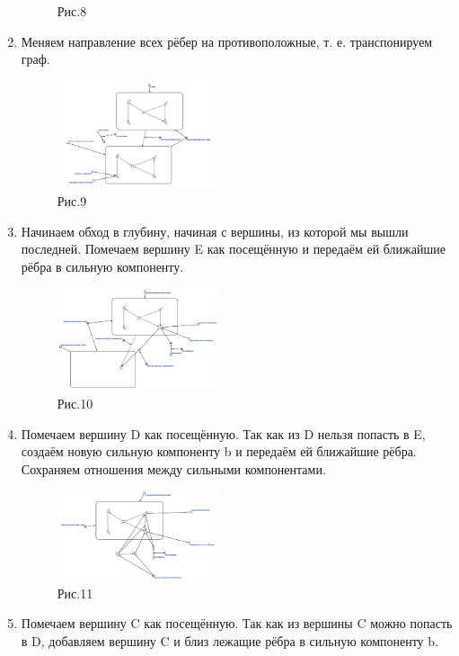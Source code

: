 \documentclass[10pt,a4paper,twocolumn]{article}
\begin{document}
\begin{enumerate}
\begin{figure}[h]
		\caption{Рис.8}
	\end{figure}
	\item Меняем направление всех рёбер на противоположные, т. е. транспонируем граф.
	\begin{figure}[h]
		\includegraphics[width=0.45\textwidth]{img/9.png}
		\caption{Рис.9}
	\end{figure}
	\item Начинаем обход в глубину, начиная с вершины, из которой мы вышли последней. Помечаем вершину E как посещённую и передаём ей ближайшие рёбра в сильную компоненту.
	\begin{figure}[h]
		\includegraphics[width=0.45\textwidth]{img/10.png}
		\caption{Рис.10}
	\end{figure}
    \newpage
	\item Помечаем вершину D как посещённую. Так как из D нельзя попасть в E, создаём новую сильную компоненту b и передаём ей ближайшие рёбра. Сохраняем отношения между сильными компонентами.
	\begin{figure}[h]
		\includegraphics[width=0.45\textwidth]{img/11.png}
		\caption{Рис.11}
	\end{figure}
	\item Помечаем вершину C как посещённую. Так как из вершины C можно попасть в D, добавляем вершину C и близ лежащие рёбра в сильную компоненту b.
	\begin{figure}[h]

\end{figure}
\end{enumerate}
\end{document}
